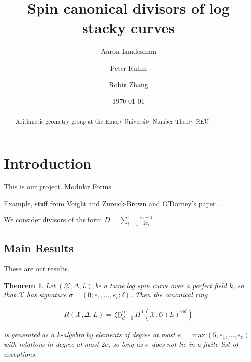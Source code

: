 \documentclass{amsart}
\title{Spin canonical divisors of log stacky curves}
\author{Aaron Landesman}
\author{Peter Ruhm}
\author{Robin Zhang}
\date{\today}
\theoremstyle{plain}
\newtheorem{thm}{Theorem}[section]
\theoremstyle{definition}
\theoremstyle{remark}
\numberwithin{equation}{section}
\newcommand \sx{\mathscr X}
\newcommand\sco{{\mathscr O}}
\newcommand \subhalf[1]{\frac{{#1} - 1}{2{#1}}}
\begin{document}
\begin{abstract}
  Arithmetic geometry group at the Emory University Number Theory
	REU.
\end{abstract}

\maketitle

\tableofcontents















\section{Introduction}
This is our project.
Modular Forms.


Example, stuff from Voight and Zureick-Brown \cite{vzb:stacky}
and O'Dorney's paper \cite{dorney:canonical}.

We consider divisors of the form $D = \sum_{i = 1}^{r} \subhalf{e_i}$.

\subsection{Main Results}
These are our results.
\begin{thm}
\label{thm:g_0_generators_relations}
Let $(\sx, \Delta, L)$ be a tame log spin curve over a perfect field $k$, so
that $\sx$ has signature $\sigma = (0; e_1, \ldots, e_r; \delta)$. Then the
canonical ring

\begin{align*}
	R(\sx, \Delta, L) = \bigoplus_{d = 0}^\infty H^0(\sx, \sco(L)^{\otimes d})
\end{align*}

\noindent
is generated as a $k$-algebra by elements of degree at most $e = 
\max(5,e_1,\ldots, e_r)$ with relations in degree at most $2e$, so 
long as $\sigma$ does not lie in a finite list of exceptions. 
\end{thm}
\end{document}
